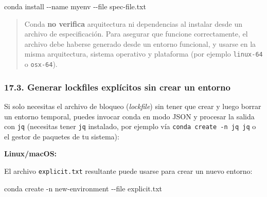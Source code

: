 \documentclass[
  doc,
  floatsintext,
  longtable,
  a4paper,
  nolmodern,
  notxfonts,
  notimes,
  12pt,
  colorlinks=true,linkcolor=blue,citecolor=blue,urlcolor=blue]{apa7}
\newenvironment{Shaded}{\begin{snugshade}}{\end{snugshade}}
\newcommand{\AttributeTok}[1]{\textcolor[rgb]{0.40,0.45,0.13}{#1}}
\newcommand{\BuiltInTok}[1]{\textcolor[rgb]{0.00,0.23,0.31}{#1}}
\newcommand{\ExtensionTok}[1]{\textcolor[rgb]{0.00,0.23,0.31}{#1}}
\newcommand{\FunctionTok}[1]{\textcolor[rgb]{0.28,0.35,0.67}{#1}}
\newcommand{\KeywordTok}[1]{\textcolor[rgb]{0.00,0.23,0.31}{\textbf{#1}}}
\newcommand{\NormalTok}[1]{\textcolor[rgb]{0.00,0.23,0.31}{#1}}
\newcommand{\OperatorTok}[1]{\textcolor[rgb]{0.37,0.37,0.37}{#1}}
\newcommand{\StringTok}[1]{\textcolor[rgb]{0.13,0.47,0.30}{#1}}
\newcommand{\VariableTok}[1]{\textcolor[rgb]{0.07,0.07,0.07}{#1}}
\begin{document}
\begin{Shaded}
\begin{Highlighting}[]
\ExtensionTok{conda}\NormalTok{ install }\AttributeTok{{-}{-}name}\NormalTok{ myenv }\AttributeTok{{-}{-}file}\NormalTok{ spec{-}file.txt}
\end{Highlighting}
\end{Shaded}

\begin{quote}
Conda \textbf{no verifica} arquitectura ni dependencias al instalar
desde un archivo de especificación. Para asegurar que funcione
correctamente, el archivo debe haberse generado desde un entorno
funcional, y usarse en la misma arquitectura, sistema operativo y
plataforma (por ejemplo \texttt{linux-64} o \texttt{osx-64}).
\end{quote}

\subsubsection{17.3. Generar lockfiles explícitos sin crear un
entorno}\label{generar-lockfiles-expluxedcitos-sin-crear-un-entorno}

Si solo necesitas el archivo de bloqueo (\emph{lockfile}) sin tener que
crear y luego borrar un entorno temporal, puedes invocar conda en modo
JSON y procesar la salida con \texttt{jq} (necesitas tener \texttt{jq}
instalado, por ejemplo vía \texttt{conda\ create\ -n\ jq\ jq} o el
gestor de paquetes de tu sistema):

\textbf{Linux/macOS:}

\begin{Shaded}
\end{Shaded}

El archivo \texttt{explicit.txt} resultante puede usarse para crear un
nuevo entorno:

\begin{Shaded}
\begin{Highlighting}[]
\ExtensionTok{conda}\NormalTok{ create }\AttributeTok{{-}n}\NormalTok{ new{-}environment }\AttributeTok{{-}{-}file}\NormalTok{ explicit.txt}
\end{Highlighting}
\end{Shaded}
\end{document}

